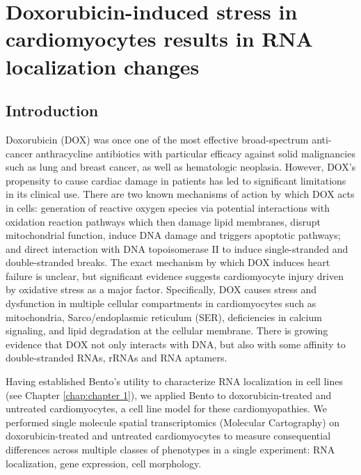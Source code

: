 \chapter{Doxorubicin-induced stress in cardiomyocytes results in RNA localization changes}\label{chap:chapter2}

\section{Introduction}

Doxorubicin (DOX) was once one of the most effective broad-spectrum anti-cancer anthracycline antibiotics\cite{kalyanaramanTeachingBasicsMechanism2020,youngAnthracyclineAntineoplasticDrugs1981} with particular efficacy against solid malignancies such as lung and breast cancer, as well as hematologic neoplasia\cite{sheibaniDoxorubicinInducedCardiotoxicityOverview2022,yuRecentProgressDoxorubicininduced2018}. However, DOX's propensity to cause cardiac damage in patients has led to significant limitations in its clinical use\cite{rahmanAnthracyclineinducedCardiotoxicityCardiacsparing2007}. There are two known mechanisms of action by which DOX acts in cells\cite{teweyAdriamycininducedDNADamage1984}: generation of reactive oxygen species via potential interactions with oxidation reaction pathways which then damage lipid membranes, disrupt mitochondrial function, induce DNA damage and triggers apoptotic pathways; and direct interaction with DNA topoisomerase II to induce single-stranded and double-stranded breaks. The exact mechanism by which DOX induces heart failure is unclear, but significant evidence suggests cardiomyocyte injury driven by oxidative stress as a major factor\cite{asensio-lopezDoxorubicininducedOxidativeStress2017,sheibaniDoxorubicinInducedCardiotoxicityOverview2022,simunekAnthracyclineinducedCardiotoxicityOverview2009,xiongProtectiveEffectBerberine2018,xuEffectsDoxorubicinMyocardium2001}. Specifically, DOX causes stress and dysfunction in multiple cellular compartments in cardiomyocytes such as mitochondria, Sarco/endoplasmic reticulum (SER), deficiencies in calcium signaling, and lipid degradation at the cellular membrane\cite{rawatDoxorubicininducedCardiotoxicityUpdate2021}. There is growing evidence that DOX not only interacts with DNA, but also with some affinity to double-stranded RNAs\cite{rubioDoxorubicinBindsDuplex2016}, rRNAs\cite{marcheschiSelectionCharacterizationSmall2009} and RNA aptamers\cite{bagalkotAptamerDoxorubicinPhysical2006}.

Having established Bento's utility to characterize RNA localization in cell lines (see Chapter \ref{chap:chapter 1}), we applied Bento to doxorubicin-treated and untreated cardiomyocytes, a cell line model for these cardiomyopathies. We performed single molecule spatial transcriptomics (Molecular Cartography) on doxorubicin-treated and untreated cardiomyocytes to measure consequential differences across multiple classes of phenotypes in a single experiment: RNA localization, gene expression, cell morphology.

